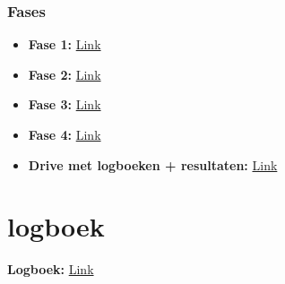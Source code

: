 \documentclass[12pt]{article}
\begin{document}
\subsubsection*{Fases}
\noindent\begin{itemize}
    \item \textbf{Fase 1: }\href{https://docs.google.com/document/d/1GbDkCxC9d_qvIaFt9WLgdqDdbehZgxvDl6xok6A8UG4}{Link} 
    \item \textbf{Fase 2: }\href{https://docs.google.com/document/d/1dRJIgrINIqM23WWmCmnGbnBuHpgw_vz0cuFKtMpCIMs}{Link} 
    \item \textbf{Fase 3: }\href{https://docs.google.com/document/d/1c8uWC6ebqpnVRqx3ldwISSlsHXozZ7VrJujyB8FCNq4}{Link} 
    \item \textbf{Fase 4: }\href{https://docs.google.com/document/d/1G-Xw7bRIdZ-OzQIb8x2kHXSOT6rMff9jRx3bLR63h5I}{Link} 
    \item \textbf{Drive met logboeken + resultaten: }\href{https://drive.google.com/drive/folders/13nWxB8IXRV8BVmQFYKsMhVHrp6tId7Cc?usp=drive_link}{Link} 
\end{itemize}

\pagebreak
\section{logboek}
\noindent\textbf{Logboek: }\href{https://docs.google.com/spreadsheets/d/1iMSadKjVQ10j7RvIdU1Dxt36Q_K4ckz7q1kMr5_YCWw/edit?usp=sharing}{Link} 
\end{document}

